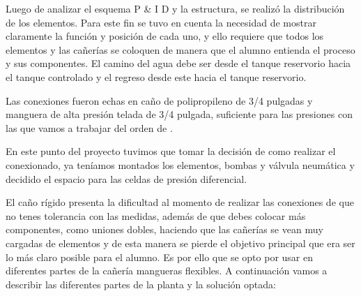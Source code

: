 Luego de analizar el esquema P \& I D y  la estructura, se realizó la distribución de los elementos.
Para este fin se tuvo en cuenta la necesidad de mostrar claramente la función y posición de cada uno,
y ello requiere que todos los elementos y las cañerías se coloquen de manera que el alumno entienda
el proceso y sus componentes. El camino del  agua debe ser desde el tanque reservorio hacia el tanque
controlado y el regreso desde este hacia el tanque reservorio.

Las conexiones fueron echas en caño de polipropileno de 3/4 pulgadas y manguera de alta presión telada
de 3/4 pulgada, suficiente para las presiones con las que vamos a trabajar del orden de . 

En este punto del proyecto tuvimos que tomar la decisión de como realizar el conexionado, ya teníamos 
montados los elementos, bombas y válvula neumática y decidido el espacio para las celdas de presión
diferencial.

El caño rígido presenta la dificultad al momento de realizar las conexiones de que no tenes tolerancia
con las medidas, además de que debes colocar más componentes, como uniones dobles, haciendo que las
cañerías se vean muy cargadas de elementos y de esta manera se pierde el objetivo principal que era 
ser lo  más claro posible para el alumno. Es por ello que se opto por usar en diferentes partes de 
la cañería mangueras flexibles.
A continuación vamos a describir las diferentes partes de la planta y la solución optada:

